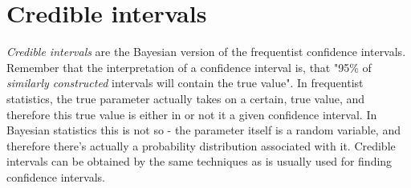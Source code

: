 \documentclass[12pt, a4paper]{article}
\begin{document}
\section{Credible intervals}
\textit{Credible intervals} are the Bayesian version of the frequentist confidence intervals. Remember that the interpretation of a confidence interval is, that "95\% of \textit{similarly constructed} intervals will contain the true value". In frequentist statistics, the true parameter actually takes on a certain, true value, and therefore this true value is either in or not it a given confidence interval. In Bayesian statistics this is not so - the parameter itself is a random variable, and therefore there's actually a probability distribution associated with it. Credible intervals can be obtained by the same techniques as is usually used for finding confidence intervals.
\end{document}
